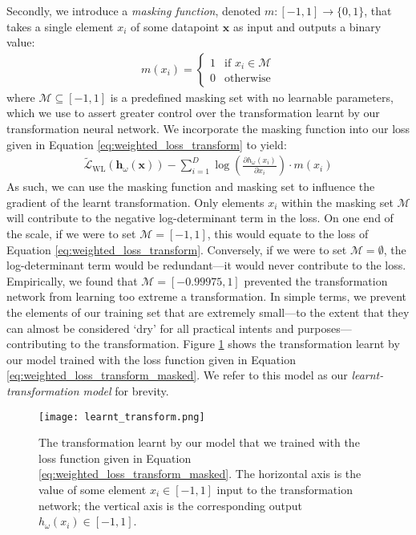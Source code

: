 \documentclass[ oneside,%
                    author={George Herbert},
                    degree={MSci},
                     title={Diffusion Models for Time-Evolving Precipitation Fields},
                  subtitle={}]{dissertation}
\begin{document}
Secondly, we introduce a \textit{masking function}, denoted $m:[-1,1]\to \{0,1\}$, that takes a single element $x_i$ of some datapoint $\mathbf{x}$ as input and outputs a binary value:
\begin{align}
      m(x_i)=\begin{cases}
            1 & \text{if } x_i\in \mathcal{M}\\
            0 & \text{otherwise}
      \end{cases}
\end{align}
where $\mathcal{M}\subseteq[-1, 1]$ is a predefined masking set with no learnable parameters, which we use to assert greater control over the transformation learnt by our transformation neural network. We incorporate the masking function into our loss given in Equation \ref{eq:weighted_loss_transform} to yield:
\begin{align}
      \tilde{\mathcal{L}}_{\mathrm{WL}}(\mathbf{h}_\omega(\mathbf{x})) - \sum_{i=1}^D \log \left(\frac{\partial h_\omega(x_i)}{\partial x_i}\right)\cdot m(x_i)\label{eq:weighted_loss_transform_masked}
\end{align}
As such, we can use the masking function and masking set to influence the gradient of the learnt transformation. Only elements $x_i$ within the masking set $\mathcal{M}$ will contribute to the negative log-determinant term in the loss. On one end of the scale, if we were to set $\mathcal{M}=[-1,1]$, this would equate to the loss of Equation \ref{eq:weighted_loss_transform}. Conversely, if we were to set $\mathcal{M}=\emptyset$, the log-determinant term would be redundant---it would never contribute to the loss. Empirically, we found that $\mathcal{M}=[-0.99975, 1]$ prevented the transformation network from learning too extreme a transformation. In simple terms, we prevent the elements of our training set that are extremely small---to the extent that they can almost be considered `dry' for all practical intents and purposes---contributing to the transformation. Figure \ref{fig:learnt_transform} shows the transformation learnt by our model trained with the loss function given in Equation \ref{eq:weighted_loss_transform_masked}. We refer to this model as our \textit{learnt-transformation model} for brevity.

\begin{figure}[htbp]
      \centering
      \texttt{[image: learnt\_transform.png]}
      \caption{The transformation learnt by our model that we trained with the loss function given in Equation \ref{eq:weighted_loss_transform_masked}. The horizontal axis is the value of some element $x_i\in[-1, 1]$ input to the transformation network; the vertical axis is the corresponding output $h_\omega(x_i)\in [-1, 1]$.}
      \label{fig:learnt_transform}
\end{figure}
\end{document}
